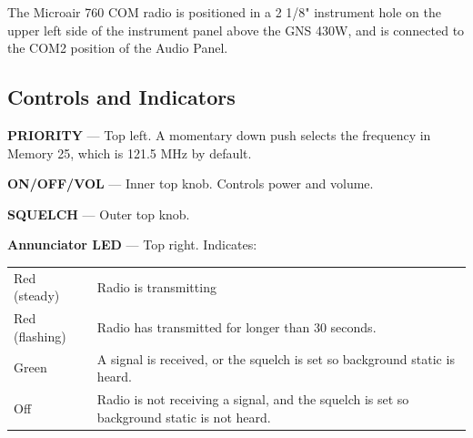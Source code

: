 The Microair 760 COM radio is positioned in a 2 1/8" instrument hole on the upper left side of the instrument panel above the GNS 430W, and is connected to the COM2 position of the Audio Panel.

\subsection*{Controls and Indicators}

\textbf{PRIORITY} --- Top left. A momentary down push selects the frequency in Memory 25, which is 121.5 MHz by default.

\textbf{ON/OFF/VOL} --- Inner top knob. Controls power and volume. 

\textbf{SQUELCH} --- Outer top knob.

\textbf{Annunciator LED} --- Top right. Indicates:

\begin{tabular}{lp{2.9in}} 
Red (steady)&Radio is transmitting\\
Red (flashing)&Radio has transmitted for longer than 30 seconds.\\
Green&A signal is received, or the squelch is set so background static is heard.\\
Off&Radio is not receiving a signal, and the squelch is set so background static is not heard.\\
\end{tabular}

